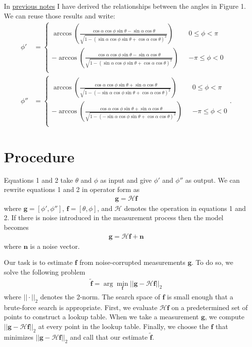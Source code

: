 \documentclass[11pt]{article}
\newcommand{\argmin}{\arg\!\min}
\providecommand{\mb}[1]{\mathbf{#1}}
\begin{document}
In
\href{https://github.com/talonchandler/dipsim/blob/master/notes/2017-06-09-rotated-frames/report/report.pdf}{previous
  notes} I have derived the relationships between the angles in Figure 1. We can
reuse those results and write:
\begin{align}
  \phi' &=
          \begin{cases}
            \arccos\left(\frac{\cos\alpha\cos\phi\sin\theta - \sin\alpha\cos\theta}{\sqrt{1 - (\sin\alpha\cos\phi\sin\theta + \cos\alpha\cos\theta)^2}}\right) \ \ \ &0 \leq \phi < \pi\\
            -\arccos\left(\frac{\cos\alpha\cos\phi\sin\theta - \sin\alpha\cos\theta}{\sqrt{1 - (\sin\alpha\cos\phi\sin\theta + \cos\alpha\cos\theta)^2}}\right) \ \ \ &-\pi \leq \phi < 0\\
            \end{cases}\\
  \phi'' &=
          \begin{cases}
            \arccos\left(\frac{\cos\alpha\cos\phi\sin\theta + \sin\alpha\cos\theta}{\sqrt{1 - (-\sin\alpha\cos\phi\sin\theta + \cos\alpha\cos\theta)^2}}\right) \ \ \ &0 \leq \phi < \pi\\
            -\arccos\left(\frac{\cos\alpha\cos\phi\sin\theta + \sin\alpha\cos\theta}{\sqrt{1 - (-\sin\alpha\cos\phi\sin\theta + \cos\alpha\cos\theta)^2}}\right) \ \ \ &-\pi \leq \phi < 0\\            
          \end{cases}.
\end{align}

\section{Procedure}
Equations 1 and 2 take $\theta$ and $\phi$ as input and give $\phi'$ and
$\phi''$ as output. We can rewrite equations 1 and 2 in operator form as
\begin{align}
  \mb{g} = \mathcal{H}\mb{f}
\end{align}
where $\mb{g} = [\phi', \phi'']$, $\mb{f} = [\theta, \phi]$, and $\mathcal{H}$
denotes the operation in equations 1 and 2. If there is noise introduced in the
measurement process then the model becomes
\begin{align}
  \mb{g} = \mathcal{H}\mb{f} + \mb{n}
\end{align}
where $\mb{n}$ is a noise vector.

Our task is to estimate $\mb{f}$ from noise-corrupted measurements $\mb{g}$. To
do so, we solve the following problem
\begin{align}
  \tilde{\mb{f}} = \argmin_{\mb{f}} ||\mb{g} - \mathcal{H}\mb{f}||_2 \label{eq:problem}
\end{align}
where $||\cdot||_2$ denotes the 2-norm. The search space of $\mb{f}$ is small
enough that a brute-force search is appropriate. First, we evaluate
$\mathcal{H}\mb{f}$ on a predetermined set of points to construct a lookup
table. When we take a measurement $\mb{g}$, we compute
$||\mb{g} - \mathcal{H}\mb{f}||_2$ at every point in the lookup table. Finally,
we choose the $\mb{f}$ that minimizes $||\mb{g} - \mathcal{H}\mb{f}||_2$ and
call that our estimate $\tilde{\mb{f}}$.
\end{document}
